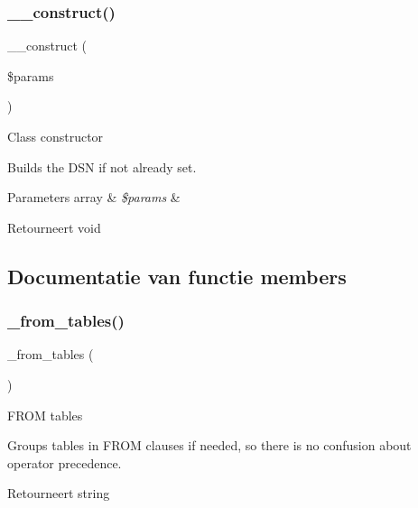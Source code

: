 \subsubsection{\texorpdfstring{\_\_construct()}{\_\_construct()}}
{\footnotesize\ttfamily \+\_\+\+\_\+construct (\begin{DoxyParamCaption}\item[{}]{\$params }\end{DoxyParamCaption})}

Class constructor

Builds the D\+SN if not already set.


\begin{DoxyParams}[1]{Parameters}
array & {\em \$params} & \\
\hline
\end{DoxyParams}
\begin{DoxyReturn}{Retourneert}
void 
\end{DoxyReturn}


\subsection{Documentatie van functie members}
\mbox{\label{class_c_i___d_b__pdo__cubrid__driver_aef43f7e3e7b71d337ff3724c5eb14f10}} 
\subsubsection{\texorpdfstring{\_from\_tables()}{\_from\_tables()}}
{\footnotesize\ttfamily \+\_\+from\+\_\+tables (\begin{DoxyParamCaption}{ }\end{DoxyParamCaption})\hspace{0.3cm}{\ttfamily [protected]}}

F\+R\+OM tables

Groups tables in F\+R\+OM clauses if needed, so there is no confusion about operator precedence.

\begin{DoxyReturn}{Retourneert}
string 
\end{DoxyReturn}
\mbox{\label{class_c_i___d_b__pdo__cubrid__driver_a7ccb7f9c301fe7f0a9db701254142b63}} 
